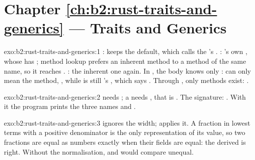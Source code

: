 \section*{Chapter \ref{ch:b2:rust-traits-and-generics} --- Traits and Generics}

\begin{solution}{exo:b2:rust-traits-and-generics:1}
:  keeps the default, which calls the 's . : 's
own , whose  has ; method lookup prefers an inherent method to a 
method of the same name, so it reaches . : the inherent one again. In , the
body knows only :  can only mean the  method, , while  is
still 's , which says . Through , only  methods exist:
.
\end{solution}

\begin{solution}{exo:b2:rust-traits-and-generics:2}
 needs ; a  needs , that is . The signature: . With it the program prints the
three names and .
\end{solution}

\begin{solution}{exo:b2:rust-traits-and-generics:3}
 ignores the width;  applies it. A fraction in lowest terms with a positive denominator is
the only representation of its value, so two fractions are equal as numbers exactly when their fields are equal: the
derived  is right. Without the normalisation,  and  would compare unequal.
\end{solution}

